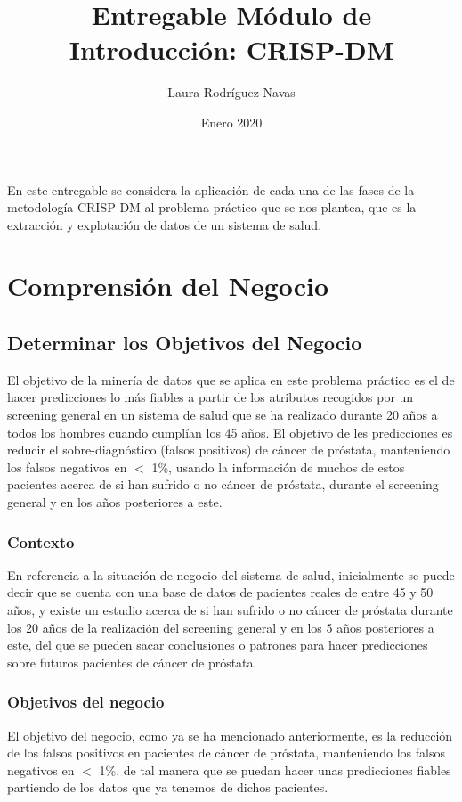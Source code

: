 \documentclass{article}
\title{Entregable Módulo de Introducción: CRISP-DM}
\author{Laura Rodríguez Navas}
\date{Enero 2020}
\begin{document}
\maketitle

En este entregable se considera la aplicación de cada una de las fases de la metodología CRISP-DM al problema práctico que se nos plantea, que es la extracción y explotación de datos de un sistema de salud.

\renewcommand{\contentsname}{Índice}
\tableofcontents

\section{Comprensión del Negocio}

\subsection{Determinar los Objetivos del Negocio}
El objetivo de la minería de datos que se aplica en este problema práctico es el de hacer predicciones lo más fiables a partir de los atributos recogidos por un screening general en un sistema de salud que se ha realizado durante 20 años a todos los hombres cuando cumplían los 45 años. El objetivo de les predicciones es reducir el sobre-diagnóstico (falsos positivos) de cáncer de próstata, manteniendo los falsos negativos en $<$ 1\%, usando la información de muchos de estos pacientes acerca de si han sufrido o no cáncer de próstata, durante el screening general y en los años posteriores a este.

\subsubsection{Contexto}
En referencia a la situación de negocio del sistema de salud, inicialmente se puede decir que se cuenta con una base de datos de pacientes reales de entre 45 y 50 años, y existe un estudio acerca de si han sufrido o no cáncer de próstata durante los 20 años de la realización del screening general y en los 5 años posteriores a este, del que se pueden sacar conclusiones o patrones para hacer predicciones sobre futuros pacientes de cáncer de próstata.

\subsubsection{Objetivos del negocio}
El objetivo del negocio, como ya se ha mencionado anteriormente, es la reducción de los falsos positivos en pacientes de cáncer de próstata, manteniendo los falsos negativos en $<$ 1\%, de tal manera que se puedan hacer unas predicciones fiables partiendo de los datos que ya tenemos de dichos pacientes. 
\end{document}
